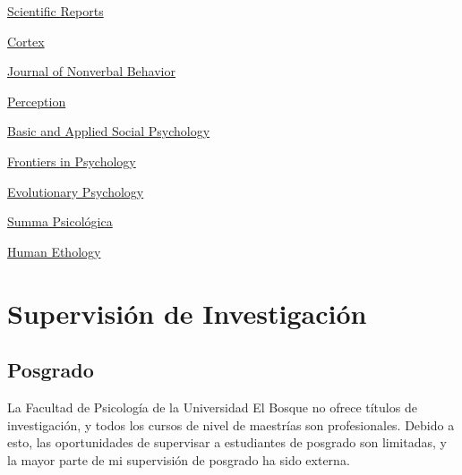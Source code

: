 \documentclass[11pt,a4paper,]{awesome-cv}
\begin{document}
\begin{cventries}
{\begin{cvitems}
\item \href{https://www.nature.com/srep/}{Scientific Reports}
\item \href{https://www.sciencedirect.com/journal/cortex}{Cortex}
\item \href{https://www.springer.com/journal/10919/}{Journal of Nonverbal Behavior}
\item \href{https://journals.sagepub.com/home/pec}{Perception}
\item \href{https://www.tandfonline.com/journals/hbas20}{Basic and Applied Social Psychology}
\item \href{https://www.frontiersin.org/journals/psychology}{Frontiers in Psychology}
\item \href{https://journals.sagepub.com/home/evp}{Evolutionary Psychology}
\item \href{http://sumapsicologica.konradlorenz.edu.co/}{Summa Psicológica}
\item \href{https://ishe.org/human-ethology/}{Human Ethology}
\end{cvitems}}
\end{cventries}

\hypertarget{supervisiuxf3n-de-investigaciuxf3n}{%
\section{Supervisión de
Investigación}\label{supervisiuxf3n-de-investigaciuxf3n}}

\hypertarget{section-3}{%
\subsection{\texorpdfstring{\textbf{Posgrado}}{}}\label{section-3}}

La Facultad de Psicología de la Universidad El Bosque no ofrece títulos
de investigación, y todos los cursos de nivel de maestrías son
profesionales. Debido a esto, las oportunidades de supervisar a
estudiantes de posgrado son limitadas, y la mayor parte de mi
supervisión de posgrado ha sido externa.
\end{document}
